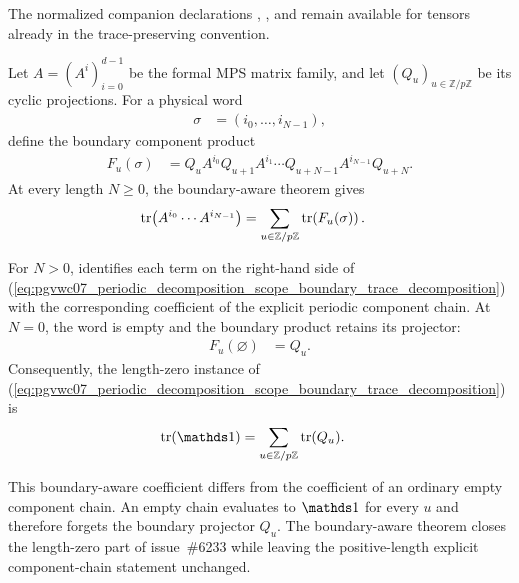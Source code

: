 \documentclass{article}
\begin{document}
The normalized companion declarations
,
, and
remain available for tensors already in the trace-preserving
 convention.

Let $A=(A^i)_{i=0}^{d-1}$ be the formal MPS matrix family, and let
$(Q_u)_{u\in\mathbb Z/p\mathbb Z}$ be its cyclic projections. For a physical
word
\begin{align}
    \sigma
     & = (i_0,\ldots,i_{N-1}),
    \label{eq:pgvwc07_periodic_decomposition_scope_physical_word}
\end{align}
define the boundary component product
\begin{align}
    F_u(\sigma)
     & =
    Q_u A^{i_0}Q_{u+1}A^{i_1}\cdots
    Q_{u+N-1}A^{i_{N-1}}Q_{u+N}.
    \label{eq:pgvwc07_periodic_decomposition_scope_boundary_component_product}
\end{align}
At every length $N\geq0$, the boundary-aware theorem gives
\begin{align}
    \operatorname{tr}\!\left(A^{i_0}\cdots A^{i_{N-1}}\right)
     & =
    \sum_{u\in\mathbb Z/p\mathbb Z}
    \operatorname{tr}\!\left(F_u(\sigma)\right).
    \label{eq:pgvwc07_periodic_decomposition_scope_boundary_trace_decomposition}
\end{align}

For $N>0$,
identifies each term on the right-hand side of
(\ref{eq:pgvwc07_periodic_decomposition_scope_boundary_trace_decomposition})
with the corresponding coefficient of the explicit periodic component chain.
At $N=0$, the word is empty and the boundary product retains its projector:
\begin{align}
    F_u(\varnothing)
     & = Q_u.
    \label{eq:pgvwc07_periodic_decomposition_scope_empty_boundary_product}
\end{align}
Consequently, the length-zero instance of
(\ref{eq:pgvwc07_periodic_decomposition_scope_boundary_trace_decomposition})
is
\begin{align}
    \tr(\Id)
     & =
    \sum_{u\in\mathbb Z/p\mathbb Z}\tr(Q_u).
    \label{eq:pgvwc07_periodic_decomposition_scope_empty_trace_decomposition}
\end{align}

This boundary-aware coefficient differs from the coefficient of an ordinary
empty component chain. An empty chain evaluates to $\Id$ for every $u$ and
therefore forgets the boundary projector $Q_u$. The boundary-aware theorem
closes the length-zero part of issue~\#6233 while leaving the positive-length
explicit component-chain statement unchanged.
\end{document}

